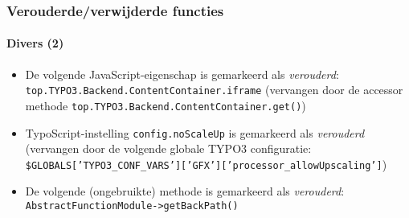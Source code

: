 \begin{frame}[fragile]
	\frametitle{Verouderde/verwijderde functies}
	\framesubtitle{Divers (2)}


	\begin{itemize}

		\item De volgende JavaScript-eigenschap is gemarkeerd als \textit{verouderd}:\newline
			\texttt{top.TYPO3.Backend.ContentContainer.iframe}\newline
			\smaller
				(vervangen door de accessor methode \texttt{top.TYPO3.Backend.ContentContainer.get()})
			\normalsize

		\item TypoScript-instelling \texttt{config.noScaleUp} is gemarkeerd als \textit{verouderd}\newline
			\smaller
				(vervangen door de volgende globale TYPO3 configuratie:\newline
				\texttt{\$GLOBALS['TYPO3\_CONF\_VARS']['GFX']['processor\_allowUpscaling']})
			\normalsize

		\item De volgende (ongebruikte) methode is gemarkeerd als \textit{verouderd}:\newline
			\texttt{AbstractFunctionModule->getBackPath()}

	\end{itemize}

\end{frame}







